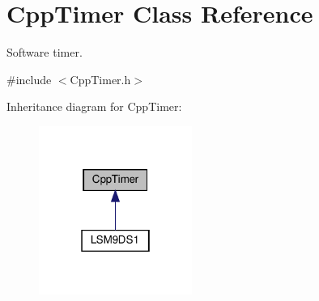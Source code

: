 \hypertarget{classCppTimer}{}\section{Cpp\+Timer Class Reference}
\label{classCppTimer}


Software timer.  




{\ttfamily \#include $<$Cpp\+Timer.\+h$>$}



Inheritance diagram for Cpp\+Timer\+:
\nopagebreak
\begin{figure}[H]
\begin{center}
\leavevmode
\includegraphics[width=142pt]{classCppTimer__inherit__graph}
\end{center}
\end{figure}
